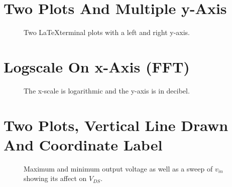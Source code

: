 \documentclass[10pt,a4paper,final]{report}
\begin{document}
\section{Two Plots And Multiple y-Axis}
\begin{figure}[!htbp]
\begin{center}
\resizebox{\columnwidth}{!}{}
\caption{Two \LaTeX terminal plots with a left and right y-axis.}
\label{fig:11cTRAngle}
\end{center}
\end{figure}


\section{Logscale On x-Axis (FFT)}
\begin{figure}[!htbp]
\begin{center}
\resizebox{\columnwidth}{!}{}
\caption{The x-scale is logarithmic and the y-axis is in decibel.}
\label{fig:FFT}
\end{center}
\end{figure}


\section{Two Plots, Vertical Line Drawn And Coordinate Label}
\begin{figure}[!htbp]
\begin{center}
\resizebox{\columnwidth}{!}{}
\caption{Maximum and minimum output voltage as well as a sweep of $v_\mathit{in}$ showing its affect on $V_\mathit{DS}$.}
\label{fig:MaxMinVoltages}
\end{center}
\end{figure}

\end{document}
